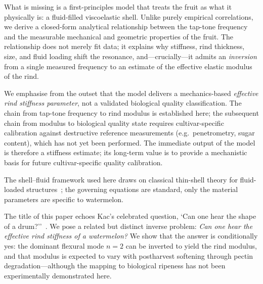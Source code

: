 
What is missing is a first-principles model that treats the fruit as what
it physically is: a fluid-filled viscoelastic shell.  Unlike purely
empirical correlations, we derive a closed-form analytical relationship
between the tap-tone frequency and the measurable mechanical and
geometric properties of the fruit.  The relationship does not merely fit
data; it explains why stiffness, rind thickness, size, and fluid loading
shift the resonance, and---crucially---it admits an \emph{inversion} from
a single measured frequency to an estimate of the effective elastic
modulus of the rind.

We emphasise from the outset that the model delivers a mechanics-based
\emph{effective rind stiffness parameter}, not a validated biological
quality classification.  The chain from tap-tone frequency to rind modulus is
established here; the subsequent chain from modulus to biological
quality state requires cultivar-specific calibration against
destructive reference measurements (e.g.\ penetrometry, sugar content),
which has not yet been performed.
The immediate output of the model is therefore a stiffness estimate;
its long-term value is to provide a mechanistic basis for future
cultivar-specific quality calibration.


The shell--fluid framework used here draws on classical thin-shell
theory for fluid-loaded structures~\cite{JungerFeit1972,Soedel2004};
the governing equations are standard, only the material parameters
are specific to watermelon.


The title of this paper echoes Kac's celebrated question, `Can one hear
the shape of a drum?''~\cite{Kac1966}.  We pose a related but distinct
inverse problem: \emph{Can one hear the effective rind stiffness of a
watermelon?}  We show that the answer is conditionally yes: the dominant
flexural mode $n = 2$ can be inverted to yield the rind modulus, and
that modulus is expected to vary with postharvest softening through
pectin degradation---although the mapping to biological ripeness has not
been experimentally demonstrated here.


